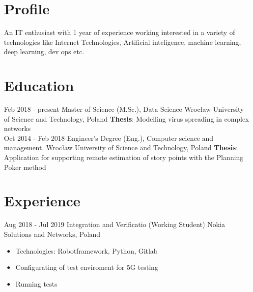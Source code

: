 \documentclass[letterpaper]{tenseconds} %
\begin{document}
\makeprofile %

\section{Profile}
\textnormal An IT enthusiast with 1 year of experience working interested in a variety of technologies like Internet Technologies, Artificial inteligence, machine learning, deep learning, dev ops etc.

\section{Education}
\begin{twenty} %
	\twentyitem
	{Feb 2018 -}
	{present}
	{Master of Science (M.Sc.), Data Science}
	{Wrocław University of Science and Technology, Poland \href{https://pwr.edu.pl/}{\faExternalLink}}
	{
		\textbf{Thesis}: Modelling virus spreading in complex networks
	}
	{}
	{}
	\\
	\twentyitem
	{Oct 2014 -}
	{Feb 2018}
	{Engineer's Degree (Eng.), Computer science and management.}
	{Wrocław University of Science and Technology, Poland \href{https://pwr.edu.pl/}{\faExternalLink}}
	{
		\textbf{Thesis}:  Application for supporting remote estimation of story points with the Planning Poker method
	}
	{}
	{}
\end{twenty}

\section{Experience}
\begin{twenty} %
	\twentyitem
	{Aug 2018 -}
	{Jul 2019}
	{Integration and Verificatio \textnormal{(Working Student)}}
	{Nokia Solutions and Networks, Poland \href{https://nokiawroclaw.pl/}{\faExternalLink}}
	{}
	{\begin{itemize}
			\item Technologies: Robotframework, Python, Gitlab
			\item Configurating of test enviroment for 5G testing
			\item Running tests
		\end{itemize}}
\end{twenty}
\end{document}
